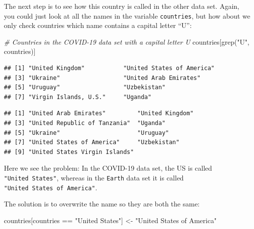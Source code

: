\documentclass[
]{book}
\newenvironment{Shaded}{\begin{snugshade}}{\end{snugshade}}
\newcommand{\CommentTok}[1]{\textcolor[rgb]{0.56,0.35,0.01}{\textit{#1}}}
\newcommand{\FunctionTok}[1]{\textcolor[rgb]{0.00,0.00,0.00}{#1}}
\newcommand{\NormalTok}[1]{#1}
\newcommand{\OtherTok}[1]{\textcolor[rgb]{0.56,0.35,0.01}{#1}}
\newcommand{\SpecialCharTok}[1]{\textcolor[rgb]{0.00,0.00,0.00}{#1}}
\newcommand{\StringTok}[1]{\textcolor[rgb]{0.31,0.60,0.02}{#1}}
\begin{document}
The next step is to see how this country is called in the other data set. Again, you could just look at all the names in the variable \texttt{countries}, but how about we only check countries which name contains a capital letter ``U'':

\begin{Shaded}
\begin{Highlighting}[]
\CommentTok{\# Countries in the COVID{-}19 data set with a capital letter U}
\NormalTok{countries[}\FunctionTok{grep}\NormalTok{(}\StringTok{"U"}\NormalTok{, countries)]}
\end{Highlighting}
\end{Shaded}

\begin{verbatim}
## [1] "United Kingdom"           "United States of America"
## [3] "Ukraine"                  "United Arab Emirates"    
## [5] "Uruguay"                  "Uzbekistan"              
## [7] "Virgin Islands, U.S."     "Uganda"
\end{verbatim}

\begin{Shaded}
\end{Shaded}

\begin{verbatim}
## [1] "United Arab Emirates"         "United Kingdom"              
## [3] "United Republic of Tanzania"  "Uganda"                      
## [5] "Ukraine"                      "Uruguay"                     
## [7] "United States of America"     "Uzbekistan"                  
## [9] "United States Virgin Islands"
\end{verbatim}

Here we see the problem: In the COVID-19 data set, the US is called \texttt{"United\ States"}, whereas in the \texttt{Earth} data set it is called \texttt{"United\ States\ of\ America"}.

The solution is to overwrite the name so they are both the same:

\begin{Shaded}
\begin{Highlighting}[]
\NormalTok{countries[countries }\SpecialCharTok{==} \StringTok{"United States"}\NormalTok{] }\OtherTok{\textless{}{-}} \StringTok{"United States of America"}
\end{Highlighting}
\end{Shaded}
\end{document}

